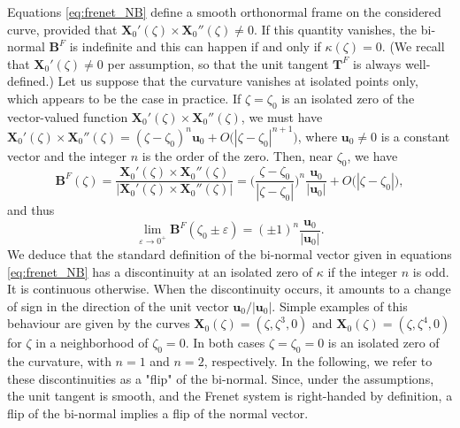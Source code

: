\documentclass[12pt]{iopart}
\newcommand\hladdedrev[1]{#1} %
\newcommand\X{{\bm{X}}_0}
\newcommand\Xp{\X'}
\newcommand\Xpp{\X''}
\newcommand\Tfrenet{{\bm T}^F}
\newcommand\Bfrenet{{\bm B}^F}
\newcommand\binormal[1]{bi-normal{#1}}
\begin{document}
\hladdedrev{Equations \eqref{eq:frenet_NB} define a smooth orthonormal frame on the considered curve, provided that $\Xp(\zeta) \times \Xpp(\zeta) \not = 0$. If this quantity vanishes, the \binormal{ } $\Bfrenet$ is indefinite and this can happen if and only if $\kappa(\zeta) = 0$. (We recall that $\Xp(\zeta) \not=0$ per assumption, so that the unit tangent $\Tfrenet$ is always well-defined.) Let us suppose that the curvature vanishes at isolated points only, which appears to be the case in practice. If $\zeta = \zeta_0$ is an isolated zero of the vector-valued function $\Xp(\zeta) \times \Xpp(\zeta)$, we must have $\Xp(\zeta) \times \Xpp(\zeta) = (\zeta - \zeta_0)^n \boldsymbol{u}_0 + O \big(|\zeta-\zeta_0|^{n+1}\big)$, where $\boldsymbol{u}_0 \not=0$ is a constant vector and the integer $n$ is the order of the zero. Then, near $\zeta_0$, we have
\begin{equation*}
    \Bfrenet(\zeta) = \frac{\Xp(\zeta) \times \Xpp(\zeta)}{|\Xp(\zeta) \times \Xpp(\zeta)|} =  \bigg(\frac{\zeta - \zeta_0}{|\zeta - \zeta_0|} \bigg)^n \frac{\boldsymbol{u}_0}{|\boldsymbol{u}_0|} + O\big(|\zeta-\zeta_0|\big),
\end{equation*}
and thus
\begin{equation*}
    \lim_{\varepsilon \to 0^+} \Bfrenet(\zeta_0 \pm \varepsilon) = (\pm 1)^n \frac{\boldsymbol{u}_0}{|\boldsymbol{u}_0|}.
\end{equation*}
We deduce that the standard definition of the \binormal{ } vector given in equations \eqref{eq:frenet_NB} has a discontinuity at an isolated zero of $\kappa$ if the integer $n$ is odd. It is continuous otherwise.
When the discontinuity occurs, it amounts to a change of sign in the direction of the unit vector $\boldsymbol{u}_0 / |\boldsymbol{u}_0|$. Simple examples of this behaviour are given by the curves $\X(\zeta) = (\zeta, \zeta^3, 0)$ and $\X(\zeta) = (\zeta, \zeta^4,0)$ for $\zeta$ in a neighborhood of $\zeta_0 = 0$. In both cases $\zeta=\zeta_0=0$ is an isolated zero of the curvature, with $n=1$ and $n=2$, respectively. In the following, we  refer to these discontinuities as a "flip" of the \binormal{}.  Since, under the assumptions, the unit tangent is smooth, and the Frenet system is right-handed by definition, a flip of the \binormal{ } implies a flip of the normal vector. 
}
\end{document}
